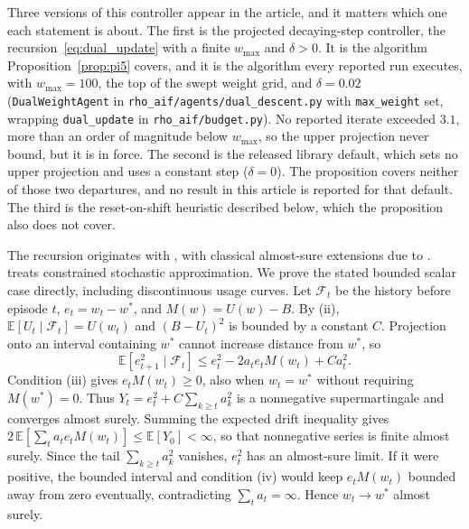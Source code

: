 Three versions of this controller appear in the article, and it matters which one each statement is about. The first is the projected decaying-step controller, the recursion~\eqref{eq:dual_update} with a finite $w_{\max}$ and $\delta > 0$. It is the algorithm Proposition~\ref{prop:pi5} covers, and it is the algorithm every reported run executes, with $w_{\max}{=}100$, the top of the swept weight grid, and $\delta{=}0.02$ (\texttt{DualWeightAgent} in \texttt{rho\_\allowbreak aif/\allowbreak agents/\allowbreak dual\_\allowbreak descent.py} with \texttt{max\_\allowbreak weight} set, wrapping \texttt{dual\_\allowbreak update} in \texttt{rho\_\allowbreak aif/\allowbreak budget.py}). No reported iterate exceeded $3.1$, more than an order of magnitude below $w_{\max}$, so the upper projection never bound, but it is in force. The second is the released library default, which sets no upper projection and uses a constant step ($\delta{=}0$). The proposition covers neither of those two departures, and no result in this article is reported for that default. The third is the reset-on-shift heuristic described below, which the proposition also does not cover.

The recursion originates with \citet{robbins1951}, with classical almost-sure extensions due to \citet{blum1954}. \citet{kushner1978} treats constrained stochastic approximation. We prove the stated bounded scalar case directly, including discontinuous usage curves. Let $\mathcal{F}_t$ be the history before episode $t$, $e_t=w_t-w^*$, and $M(w)=U(w)-B$. By (ii), $\mathbb{E}[U_t\mid\mathcal{F}_t]=U(w_t)$ and $(B-U_t)^2$ is bounded by a constant $C$. Projection onto an interval containing $w^*$ cannot increase distance from $w^*$, so
\[
\mathbb{E}[e_{t+1}^2\mid\mathcal{F}_t]
\le e_t^2-2a_t e_t M(w_t)+C a_t^2.
\]
Condition (iii) gives $e_t M(w_t)\ge0$, also when $w_t=w^*$ without requiring $M(w^*)=0$. Thus $Y_t=e_t^2+C\sum_{k\ge t}a_k^2$ is a nonnegative supermartingale and converges almost surely. Summing the expected drift inequality gives $2\,\mathbb{E}[\sum_t a_t e_t M(w_t)]\le\mathbb{E}[Y_0]<\infty$, so that nonnegative series is finite almost surely. Since the tail $\sum_{k\ge t}a_k^2$ vanishes, $e_t^2$ has an almost-sure limit. If it were positive, the bounded interval and condition (iv) would keep $e_t M(w_t)$ bounded away from zero eventually, contradicting $\sum_t a_t=\infty$. Hence $w_t\to w^*$ almost surely.

